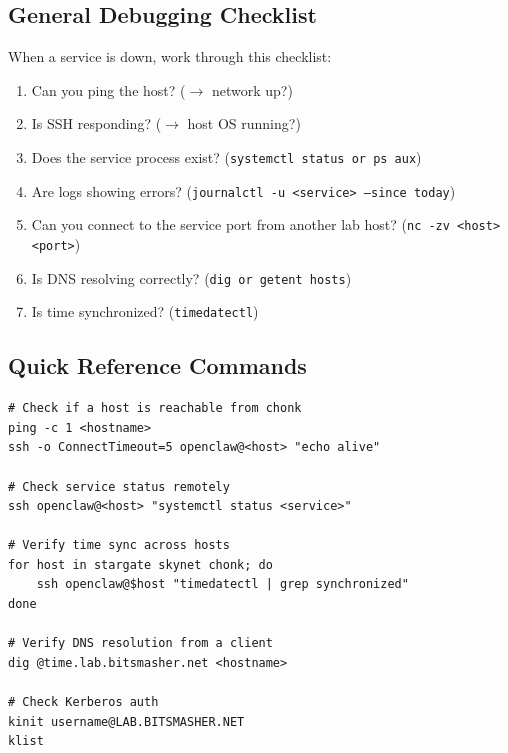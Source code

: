 \subsection{General Debugging Checklist}

When a service is down, work through this checklist:

\begin{enumerate}
    \item Can you ping the host? ($\rightarrow$ network up?)
    
    \item Is SSH responding? ($\rightarrow$ host OS running?)
    
    \item Does the service process exist? (\texttt{systemctl status or ps aux})
    
    \item Are logs showing errors? (\texttt{journalctl -u <service> --since today})
    
    \item Can you connect to the service port from another lab host? (\texttt{nc -zv <host> <port>})
    
    \item Is DNS resolving correctly? (\texttt{dig or getent hosts})
    
    \item Is time synchronized? (\texttt{timedatectl})
\end{enumerate}

\subsection{Quick Reference Commands}

\begin{lstlisting}[style=mystyle]
# Check if a host is reachable from chonk
ping -c 1 <hostname>
ssh -o ConnectTimeout=5 openclaw@<host> "echo alive"

# Check service status remotely
ssh openclaw@<host> "systemctl status <service>"

# Verify time sync across hosts
for host in stargate skynet chonk; do
    ssh openclaw@$host "timedatectl | grep synchronized"
done

# Verify DNS resolution from a client
dig @time.lab.bitsmasher.net <hostname>

# Check Kerberos auth
kinit username@LAB.BITSMASHER.NET
klist
    \end{lstlisting}
